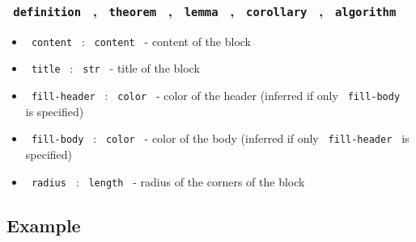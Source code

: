 \subsubsection{\texorpdfstring{\texttt{\ definition\ } ,
\texttt{\ theorem\ } , \texttt{\ lemma\ } , \texttt{\ corollary\ } ,
\texttt{\ algorithm\ }}{ definition  ,  theorem  ,  lemma  ,  corollary  ,  algorithm }}\label{definition-theorem-lemma-corollary-algorithm}

\begin{itemize}
\tightlist
\item
  \texttt{\ content\ } : \texttt{\ content\ } - content of the block
\item
  \texttt{\ title\ } : \texttt{\ str\ } - title of the block
\item
  \texttt{\ fill-header\ } : \texttt{\ color\ } - color of the header
  (inferred if only \texttt{\ fill-body\ } is specified)
\item
  \texttt{\ fill-body\ } : \texttt{\ color\ } - color of the body
  (inferred if only \texttt{\ fill-header\ } is specified)
\item
  \texttt{\ radius\ } : \texttt{\ length\ } - radius of the corners of
  the block
\end{itemize}

\subsection{Example}\label{example}

{

} {

} {

} {

} {

} {

} {

} {

} {

} {

}

